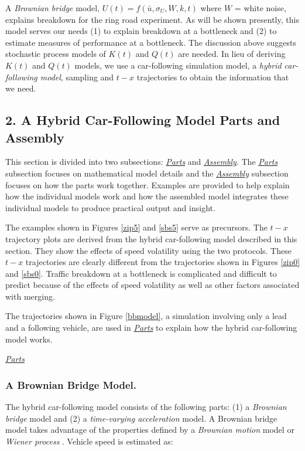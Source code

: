 \documentclass[Proceedings]{ascelike}
\begin{document}
A \emph{Brownian bridge} model, $U(t) = f(\bar{u},\sigma_U,W,k,t)$ where $W$ = white noise, explains breakdown for the ring road experiment. As will be shown presently, this model  serves our needs (1) to explain breakdown at a bottleneck and (2) to estimate measures of performance at a bottleneck. The discussion above suggests stochastic process models of $K(t)$ and $Q(t)$ are needed. In lieu of deriving $K(t)$ and $Q(t)$ models, we use a car-following simulation model, a \emph{hybrid car-following model}, sampling and $t-x$ trajectories to obtain the information that we need. 

 
\subsection{2. A Hybrid Car-Following Model Parts and Assembly} 

This section is divided into two subsections: \underline{\emph{Parts}} and \underline{\emph{Assembly}}. The \underline{\emph{Parts}} subsection focuses on mathematical model details and the \underline{\emph{Assembly}} subsection focuses on how the parts work together. Examples are provided to help explain how the individual models work and how the assembled model integrates these individual models to produce practical output and insight. 

The examples shown in Figures \ref{zip5} and \ref{sbs5} serve as precursors.  The $t-x$ trajectory plots are derived from the hybrid car-following model described in this section. They show the effects of speed volatility  using the two protocols. These $t-x$ trajectories are clearly different from the trajectories shown in Figures \ref{zip0} and \ref{sbs0}. Traffic breakdown at a bottleneck is complicated and difficult to predict because of the effects of speed volatility as well as other factors associated with merging.

The trajectories shown in Figure \ref{bbmodel}, a simulation involving only a lead and a following vehicle, are used in  \underline{\emph{Parts}} to explain how the hybrid car-following model works.

\vspace{0.1in}
\noindent \emph{\underline{Parts} }
\subsubsection{A Brownian Bridge Model.}
 The  hybrid car-following model consists of the following parts: (1)  a \emph{Brownian bridge} model and (2) a \emph{time-varying acceleration} model. A Brownian bridge model  takes advantage of the properties defined by a \emph{Brownian motion} model or  \emph{Wiener process} \cite{iacus}. Vehicle speed is estimated as:
\end{document}
